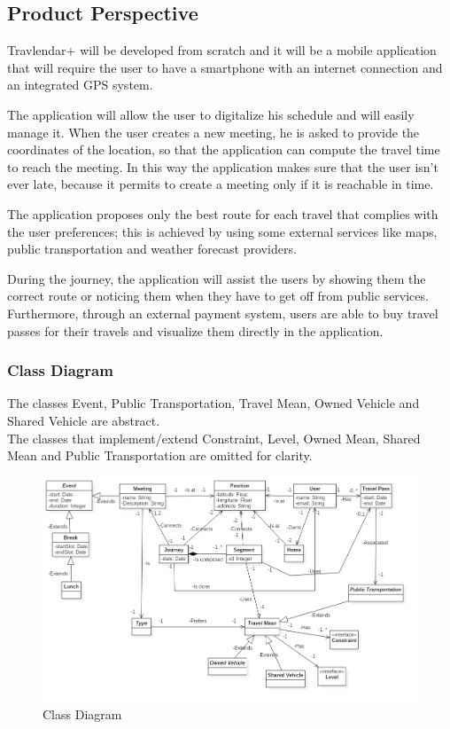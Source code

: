 \subsection{Product Perspective}
Travlendar+ will be developed from scratch and it will be a mobile application that will require the user to have a smartphone with an internet connection and an integrated GPS system.

The application will allow the user to digitalize his schedule and will easily manage it.
When the user creates a new meeting, he is asked to provide the coordinates of the location, so that the application can compute the travel time to reach the meeting.
In this way the application makes sure that the user isn't ever late, because it permits to create a meeting only if it is reachable in time.

The application proposes only the best route for each travel that complies with the user preferences; this is achieved by using some external services like maps, public transportation and weather forecast providers.

During the journey, the application will assist the users by showing them the correct route or noticing them when they have to get off from public services.
Furthermore, through an external payment system, users are able to buy travel passes for their travels and visualize them directly in the application.

\subsubsection{Class Diagram}
The classes Event, Public Transportation, Travel Mean, Owned Vehicle and Shared Vehicle are abstract.\\
The classes that implement/extend Constraint, Level, Owned Mean, Shared Mean and Public Transportation are omitted for clarity.

\begin{figure}[h]
\centering
\includegraphics[scale=0.45]{images/classdiagram}
\caption{Class Diagram}
\label{fig:classdiagram}
\end{figure}


